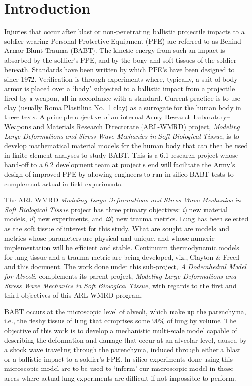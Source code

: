 \part{Introduction}
\label{partIntroduction}

Injuries that occur after blast or non-penetrating ballistic projectile impacts to a soldier wearing Personal Protective Equipment (PPE) are referred to as Behind Armor Blunt Trauma (BABT).  The kinetic energy from such an impact is absorbed by the soldier's PPE, and by the bony and soft tissues of the soldier beneath.  Standards have been written by which PPE's have been designed to since 1972.  Verification is through experiments where, typically, a suit of body armor is placed over a `body' subjected to a ballistic impact from a projectile fired by a weapon, all in accordance with a standard.  Current practice is to use clay (usually Roma Plastilina No.~1 clay) as a surrogate for the human body in these tests.  A principle objective of an internal Army Research Laboratory--Weapons and Materials Research Directorate (ARL-WMRD) project, \textit{Modeling Large Deformations and Stress Wave Mechanics in Soft Biological Tissue}, is to develop mathematical material models for the human body that can then be used in finite element analyses to study BABT.  This is a 6.1 research project whose hand-off to a 6.2 development team at project's end will facilitate the Army's design of improved PPE by allowing engineers to run in-silico BABT tests to complement actual in-field experiments.

The ARL-WMRD \textit{Modeling Large Deformations and Stress Wave Mechanics in Soft Biological Tissue\/} project has three primary objectives: \textit{i\/}) new material models, \textit{ii\/}) new experiments, and \textit{iii\/}) new trauma metrics.  Lung has been selected as the soft tissue of interest for this study.  What are sought are models and metrics whose parameters are physical and unique, and whose numeric implementation will be efficient and stable.  Continuum thermo\-dynamic models for lung tissue and a trauma metric are being developed, viz., Clayton \& Freed \cite{ClaytonFreed19,ClaytonFreed20} and this document.  The work done under this sub-project, \textit{A Dodecahedral Model for Alveoli}, complements its parent project, \textit{Modeling Large Deformations and Stress Wave Mechanics in Soft Biological Tissue}, with regards to the first and third objectives of this ARL-WMRD program. 

BABT occurs at the microscopic level of alveoli, which make up the parenchyma, i.e., the fleshy tissue of lung that comprises some 90\% of lung by volume.  The objective of this work is to develop a mechanistic multi-scale model capable of describing the deformation and damage that occur at an alveolar level, caused by a shock wave traveling through the parenchyma, induced through either a blast or a ballistic impact to a soldier's PPE.  In-silico experiments done using this microscopic model are to be used to `inform' our macroscopic model in those areas where actual lung experiments are difficult if not impossible to perform.

